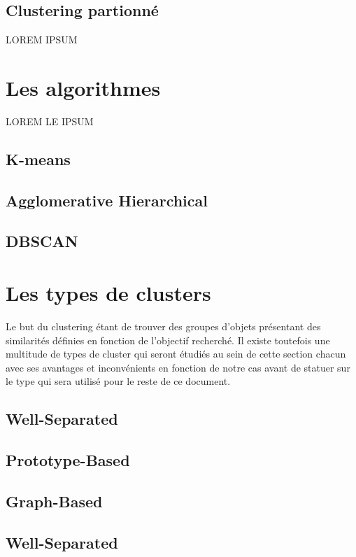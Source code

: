 \documentclass[memoire.tex]{subfiles}
\begin{document}
\newpage
\subsection{Clustering partionné}
LOREM IPSUM

\section{Les algorithmes}
LOREM LE IPSUM
\subsection{K-means}
\subsection{Agglomerative Hierarchical }
\subsection{DBSCAN}

\section{Les types de clusters}

Le but du clustering étant de trouver des groupes d'objets présentant des similarités
définies en fonction de l'objectif recherché. Il existe toutefois une multitude de types de cluster qui seront étudiés au sein de cette section chacun avec ses avantages et inconvénients en fonction de notre cas avant de statuer sur le type qui sera utilisé pour le reste de ce document.
\subsection{Well-Separated}
\subsection{Prototype-Based}
\subsection{Graph-Based}
\subsection{Well-Separated}
\end{document}
